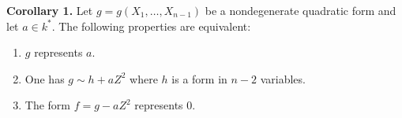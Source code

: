 \textbf{Corollary 1.} Let $g = g(X_1, \ldots, X_{n-1})$ be a nondegenerate quadratic form and let $a \in k^*$. The following properties are equivalent:

\begin{enumerate}
  \item[(i)] $g$ represents $a$.
  \item[(ii)] One has $g \sim h + aZ^2$ where $h$ is a form in $n-2$ variables.
  \item[(iii)] The form $f = g - aZ^2$ represents $0$.
\end{enumerate}
